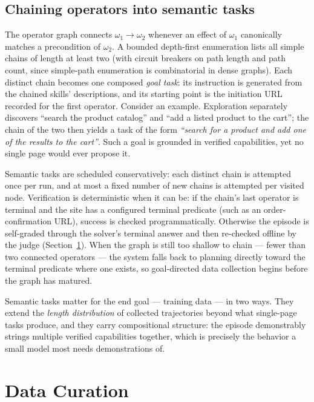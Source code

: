 \subsection{Chaining operators into semantic tasks}

The operator graph connects $\omega_1 \rightarrow \omega_2$ whenever an
effect of $\omega_1$ canonically matches a precondition of $\omega_2$. A
bounded depth-first enumeration lists all simple chains of length at least
two (with circuit breakers on path length and path count, since simple-path
enumeration is combinatorial in dense graphs). Each distinct chain becomes
one composed \emph{goal task}: its instruction is generated from the chained
skills' descriptions, and its starting point is the initiation URL recorded
for the first operator. Consider an example. Exploration separately discovers
``search the product catalog'' and ``add a listed product to the cart''; the
chain of the two then yields a task of the form \emph{``search for a product
and add one of the results to the cart''}. Such a goal is grounded in
verified capabilities, yet no single page would ever propose it.

Semantic tasks are scheduled conservatively: each distinct chain is attempted
once per run, and at most a fixed number of new chains is attempted per
visited node. Verification is deterministic when it can be: if the chain's
last operator is terminal and the site has a configured terminal predicate
(such as an order-confirmation URL), success is checked programmatically.
Otherwise the episode is self-graded through the solver's terminal answer and
then re-checked offline by the judge (Section~\ref{sec:method-data}). When
the graph is still too shallow to chain --- fewer than two connected
operators --- the system falls back to planning directly toward the terminal
predicate where one exists, so goal-directed data collection begins before
the graph has matured.

Semantic tasks matter for the end goal --- training data --- in two ways.
They extend the \emph{length distribution} of collected trajectories beyond
what single-page tasks produce, and they carry compositional structure: the
episode demonstrably strings multiple verified capabilities together, which
is precisely the behavior a small model most needs demonstrations of.

\section{Data Curation}
\label{sec:method-data}

